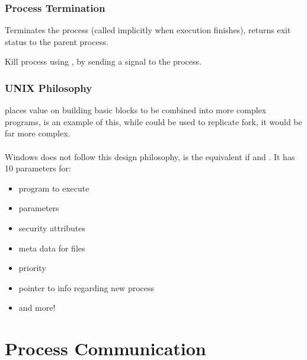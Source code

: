 \documentclass{report}
\begin{document}
        \subsubsection*{Process Termination}
            
            Terminates the process (called implicitly when execution finishes), returns exit status to the parent process.
            
            Kill process using , by sending a signal to the process.
            
        \subsubsection*{UNIX Philosophy}
             places value on building basic blocks to be combined into more complex programs,  is an example of this, while  could be used to replicate fork, it would be far more complex.
            \\
            \\ Windows does not follow this design philosophy,  is the equivalent if  and . It has 10 parameters for:
            \begin{itemize}
                \item program to execute
                \item parameters
                \item security attributes
                \item meta data for files
                \item priority
                \item pointer to info regarding new process
                \item and more!
            \end{itemize}
            
    \section*{Process Communication}
\end{document}
